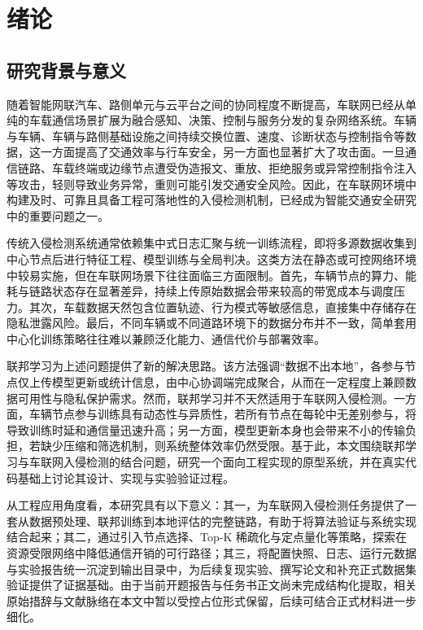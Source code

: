 \chapter{绪论}
\label{cha:introduction}

\section{研究背景与意义}
\label{sec:introduction-background}

随着智能网联汽车、路侧单元与云平台之间的协同程度不断提高，车联网已经从单纯的车载通信场景扩展为融合感知、决策、控制与服务分发的复杂网络系统。车辆与车辆、车辆与路侧基础设施之间持续交换位置、速度、诊断状态与控制指令等数据，这一方面提高了交通效率与行车安全，另一方面也显著扩大了攻击面。一旦通信链路、车载终端或边缘节点遭受伪造报文、重放、拒绝服务或异常控制指令注入等攻击，轻则导致业务异常，重则可能引发交通安全风险。因此，在车联网环境中构建及时、可靠且具备工程可落地性的入侵检测机制，已经成为智能交通安全研究中的重要问题之一\cite{placeholder_iov_security_survey,placeholder_vanet_ids_survey}。

传统入侵检测系统通常依赖集中式日志汇聚与统一训练流程，即将多源数据收集到中心节点后进行特征工程、模型训练与全局判决。这类方法在静态或可控网络环境中较易实施，但在车联网场景下往往面临三方面限制。首先，车辆节点的算力、能耗与链路状态存在显著差异，持续上传原始数据会带来较高的带宽成本与调度压力。其次，车载数据天然包含位置轨迹、行为模式等敏感信息，直接集中存储存在隐私泄露风险。最后，不同车辆或不同道路环境下的数据分布并不一致，简单套用中心化训练策略往往难以兼顾泛化能力、通信代价与部署效率\cite{placeholder_distributed_ids,placeholder_privacy_preserving_ids}。

联邦学习为上述问题提供了新的解决思路。该方法强调“数据不出本地”，各参与节点仅上传模型更新或统计信息，由中心协调端完成聚合，从而在一定程度上兼顾数据可用性与隐私保护需求\cite{placeholder_federated_learning_survey,placeholder_fedavg}。然而，联邦学习并不天然适用于车联网入侵检测。一方面，车辆节点参与训练具有动态性与异质性，若所有节点在每轮中无差别参与，将导致训练时延和通信量迅速升高；另一方面，模型更新本身也会带来不小的传输负担，若缺少压缩和筛选机制，则系统整体效率仍然受限。基于此，本文围绕联邦学习与车联网入侵检测的结合问题，研究一个面向工程实现的原型系统，并在真实代码基础上讨论其设计、实现与实验验证过程。

从工程应用角度看，本研究具有以下意义：其一，为车联网入侵检测任务提供了一套从数据预处理、联邦训练到本地评估的完整链路，有助于将算法验证与系统实现结合起来；其二，通过引入节点选择、Top-K 稀疏化与定点量化等策略，探索在资源受限网络中降低通信开销的可行路径；其三，将配置快照、日志、运行元数据与实验报告统一沉淀到输出目录中，为后续复现实验、撰写论文和补充正式数据集验证提供了证据基础。由于当前开题报告与任务书正文尚未完成结构化提取，相关原始措辞与文献脉络在本文中暂以受控占位形式保留，后续可结合正式材料进一步细化\cite{placeholder_proposal_taskbook}。

